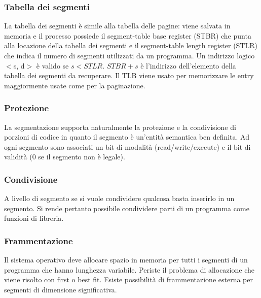 \subsubsection{Tabella dei segmenti}
La tabella dei segmenti \`e simile alla tabella delle pagine: viene salvata in memoria e il processo possiede il segment-table base register (STBR) che punta alla locazione della
tabella dei segmenti e il segment-table length register (STLR) che indica il numero di segmenti utilizzati da un programma. Un indirizzo logico $<$s, d$>$ \`e valido se $s<STLR$.
$STBR+s$ \`e l'indirizzo dell'elemento della tabella dei segmenti da recuperare. Il TLB viene usato per memorizzare le entry maggiormente usate come per la paginazione. 
\subsubsection{Protezione}
La segmentazione supporta naturalmente la protezione e la condivisione di porzioni di codice in quanto il segmento \`e un'entit\`a semantica ben definita. Ad ogni segmento sono 
associati un bit di modalit\`a (read/write/execute) e il bit di validit\`a ($0$ se il segmento non \`e legale). 
\subsubsection{Condivisione}
A livello di segmento se si vuole condividere qualcosa basta inserirlo in un segmento. Si rende pertanto possibile condividere parti di un programma come funzioni di libreria.
\subsubsection{Frammentazione}
Il sistema operativo deve allocare spazio in memoria per tutti i segmenti di un programma che hanno lunghezza variabile. Periste il problema di allocazione che viene risolto con
first o best fit. Esiste possibilit\`a di frammentazione esterna per segmenti di dimensione significativa.
